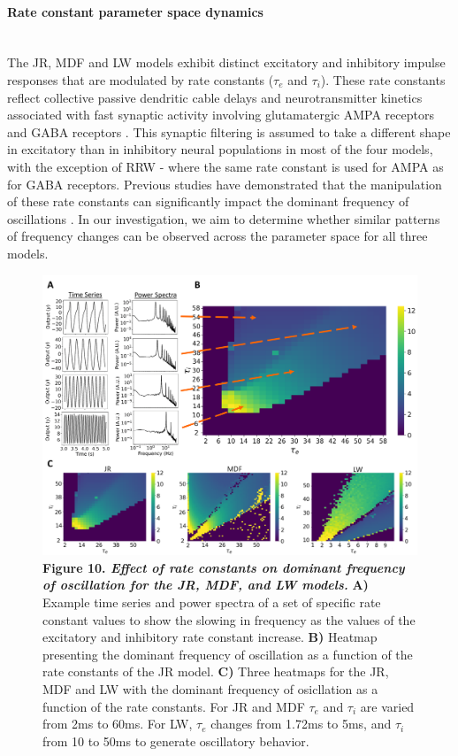 \documentclass[12pt,twoside]{article}
\begin{document}
\paragraph{Rate constant parameter space dynamics} ~\\
The JR, MDF and LW models exhibit distinct excitatory and inhibitory impulse responses that are modulated by rate constants ($\tau_{e}$ and $\tau_{i}$). These rate constants reflect collective passive dendritic cable delays and neurotransmitter kinetics associated with fast synaptic activity involving glutamatergic AMPA receptors and GABA receptors \citep{spiegler2012dynamics}. This synaptic filtering is assumed to take a different shape in excitatory than in inhibitory neural populations in most of the four models, with the exception of RRW - where the same rate constant is used for AMPA as for GABA receptors. Previous studies have demonstrated that the manipulation of these rate constants can significantly impact the dominant frequency of oscillations \citep{david2003neural, gast2019pyrates}. In our investigation, we aim to determine whether similar patterns of frequency changes can be observed across the parameter space for all three models. \\
\begin{figure}[H]
    \centering
    \includegraphics[scale=0.45]{Images/Rate_constant_4.png}
    \caption*{\textbf{Figure 10.  \textit{Effect of rate constants on dominant frequency of oscillation for the JR, MDF, and LW models.}} 
    \textbf{A)} Example time series and power spectra of a set of specific rate constant values to show the slowing in frequency as the values of the excitatory and inhibitory rate constant increase. \textbf{B)} Heatmap presenting the dominant frequency of oscillation as a function of the rate constants of the JR model. \textbf{C)} Three heatmaps for the JR, MDF and LW with the dominant frequency of osicllation as a function of the rate constants. For JR and MDF $\tau_{e}$ and $\tau_{i}$ are varied from 2ms to 60ms. For LW, $\tau_{e}$ changes from 1.72ms to 5ms, and $\tau_{i}$ from 10 to 50ms to generate oscillatory behavior.}
    \label{fig:tau_param_sweep}
\end{figure}
\end{document}
